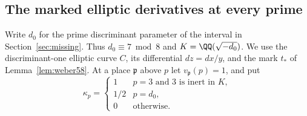 \documentclass[a4paper,11pt]{article}
\theoremstyle{definition}
\theoremstyle{remark}
\numberwithin{equation}{section}
\begin{document}
\subsection{The marked elliptic derivatives at every prime}\label{nav:V-59}
Write \(d_0\) for the prime discriminant parameter of the interval
in Section~\ref{sec:missing}. Thus \(d_0\equiv7\bmod 8\) and
\(K=\QQ(\sqrt{-d_0})\). We use the discriminant-one elliptic curve
\(C\), its differential \(dz=dx/y\), and the mark \(t_*\) of
Lemma~\ref{lem:weber58}. At a place \(\mathfrak p\) above \(p\) let
\(v_{\mathfrak p}(p)=1\), and put
\[
 \kappa_p=
 \begin{cases}
  1 & p=3\text{ and }3\text{ is inert in }K,\\
  1/2 & p=d_0,\\
  0 & \text{otherwise}.
 \end{cases}
\]
\end{document}
